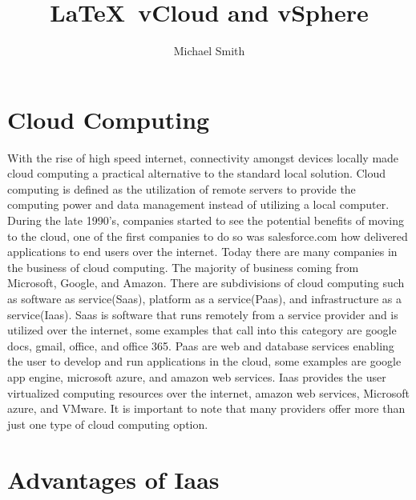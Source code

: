 \documentclass[9pt,twocolumn,twoside]{../../styles/osajnl}
\title{\LaTeX\ vCloud and vSphere}
\author[1] {Michael Smith}
\affil[1]{School of Informatics and Computing, Bloomington, IN 47408, U.S.A.}
\affil[*]{Corresponding authors: mls35@iu.edu}
\begin{document}
\maketitle

\section{Cloud Computing}

With the rise of high speed internet, connectivity amongst devices
locally made cloud computing a practical alternative to the standard
local solution.  Cloud computing is defined as the utilization of
remote servers to provide the computing power and data management
instead of utilizing a local computer.  During the late 1990's,
companies started to see the potential benefits of moving to the
cloud, one of the first companies to do so was salesforce.com how
delivered applications to end users over the internet. \cite{www-eci}
Today there are many companies in the business of cloud computing.
The majority of business coming from Microsoft, Google, and Amazon.
There are subdivisions of cloud computing such as software as
service(Saas), platform as a service(Paas), and infrastructure as a
service(Iaas).  Saas is software that runs remotely from a service
provider and is utilized over the internet, some examples that call
into this category are google docs, gmail, office, and office 365.
Paas are web and database services enabling the user to develop and
run applications in the cloud, some examples are google app engine,
microsoft azure, and amazon web services.  Iaas provides the user
virtualized computing resources over the internet, amazon web
services, Microsoft azure, and VMware.  It is important to note that
many providers offer more than just one type of cloud computing
option. \cite{www-rackspace}



\section{Advantages of Iaas}
\end{document}
